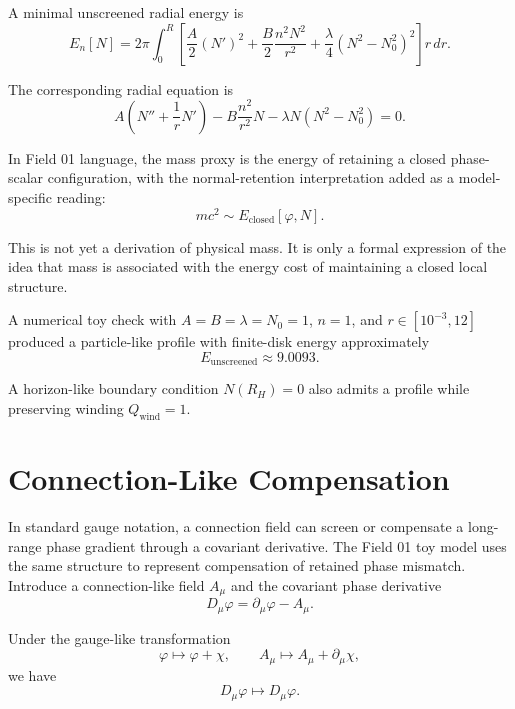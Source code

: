 \documentclass[11pt,a4paper]{article}
\newcommand{\phase}{\varphi}
\newcommand{\wind}{\mathrm{wind}}
\begin{document}
A minimal unscreened radial energy is
\begin{equation}
E_n[N]
=2\pi\int_0^R
\left[
\frac{A}{2}(N')^2
+\frac{B}{2}\frac{n^2N^2}{r^2}
+\frac{\lambda}{4}(N^2-N_0^2)^2
\right]r\,dr.
\end{equation}

The corresponding radial equation is
\begin{equation}
A\left(N''+\frac{1}{r}N'\right)
-B\frac{n^2}{r^2}N
-\lambda N(N^2-N_0^2)=0.
\end{equation}

In Field 01 language, the mass proxy is the energy of retaining a closed phase-scalar configuration, with the normal-retention interpretation added as a model-specific reading:
\begin{equation}
mc^2 \sim E_{\mathrm{closed}}[\phase,N].
\end{equation}

This is not yet a derivation of physical mass. It is only a formal expression of the idea that mass is associated with the energy cost of maintaining a closed local structure.

A numerical toy check with $A=B=\lambda=N_0=1$, $n=1$, and $r\in[10^{-3},12]$ produced a particle-like profile with finite-disk energy approximately
\begin{equation}
E_{\mathrm{unscreened}}\approx 9.0093.
\end{equation}

A horizon-like boundary condition $N(R_H)=0$ also admits a profile while preserving winding $Q_{\wind}=1$.

\section{Connection-Like Compensation}

In standard gauge notation, a connection field can screen or compensate a long-range phase gradient through a covariant derivative. The Field 01 toy model uses the same structure to represent compensation of retained phase mismatch. Introduce a connection-like field $A_\mu$ and the covariant phase derivative
\begin{equation}
D_\mu\phase=\partial_\mu\phase-A_\mu.
\end{equation}

Under the gauge-like transformation
\begin{equation}
\phase\mapsto\phase+\chi,
\qquad
A_\mu\mapsto A_\mu+\partial_\mu\chi,
\end{equation}
we have
\begin{equation}
D_\mu\phase\mapsto D_\mu\phase.
\end{equation}
\end{document}
